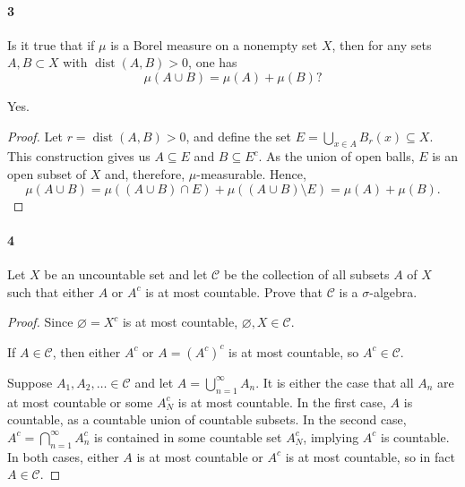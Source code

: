 \documentclass[12pt]{article}
\newlength{\myparskip}
\newenvironment{fullbox}{\begin{lrbox}{\savefullbox}\begin{minipage}{\dimexpr\textwidth-2\fboxsep\relax}\setlength{\parskip}{\myparskip}}{\end{minipage}\end{lrbox}\framebox[\textwidth]{\usebox{\savefullbox}}}
\newenvironment{pbox}[1][]{\begin{fullbox}\ifx#1\empty\else\paragraph{#1}\fi}{\end{fullbox}}
\renewcommand{\emptyset}{\varnothing}
\newcommand{\<}{\langle}
\renewcommand{\>}{\rangle}
\theoremstyle{definition}
\DeclareMathOperator{\dist}{dist}
\newcommand{\CC}{\mathcal{C}}
\begin{document}
\newpage
\begin{pbox}[3]
    Is it true that if $\mu$ is a Borel measure on a nonempty set $X$, then for any sets $A, B \subset X$ with $\dist(A, B) > 0$, one has
    \[
        \mu(A \cup B) = \mu(A) + \mu(B)?
    \]
\end{pbox}

Yes.

\begin{proof}
    Let $r = \dist(A, B) > 0$, and define the set $E = \bigcup_{x \in A} B_r(x) \subseteq X$. This construction gives us $A \subseteq E$ and $B \subseteq E^c$. As the union of open balls, $E$ is an open subset of $X$ and, therefore, $\mu$-measurable. Hence,
    \[
        \mu(A \cup B)
            = \mu((A \cup B) \cap E) + \mu((A \cup B) \setminus E)
            = \mu(A) + \mu(B).
    \]

\end{proof}


\newpage
\begin{pbox}[4]
    Let $X$ be an uncountable set and let $\CC$ be the collection of all subsets $A$ of $X$ such that either $A$ or $A^c$ is at most countable. Prove that $\CC$ is a $\sigma$-algebra.
\end{pbox}

\begin{proof}
    Since $\emptyset = X^c$ is at most countable, $\emptyset, X \in \CC$.
    
    If $A \in \CC$, then either $A^c$ or $A = (A^c)^c$ is at most countable, so $A^c \in \CC$.

    Suppose $A_1, A_2, \ldots \in \CC$ and let $A = \bigcup_{n=1}^{\infty} A_n$. It is either the case that all $A_n$ are at most countable or some $A_N^c$ is at most countable. In the first case, $A$ is countable, as a countable union of countable subsets. In the second case, $A^c = \bigcap_{n=1}^{\infty} A_n^c$ is contained in some countable set $A_N^c$, implying $A^c$ is countable. In both cases, either $A$ is at most countable or $A^c$ is at most countable, so in fact $A \in \CC$.

\end{proof}
\end{document}
